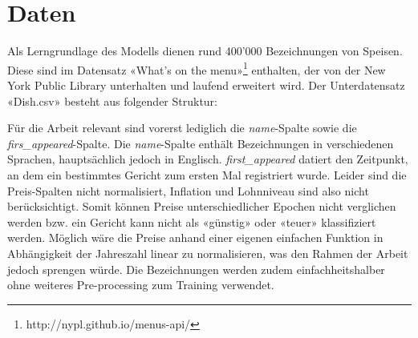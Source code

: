 \section{Daten}
\label{sec:model-data-training}

Als Lerngrundlage des Modells dienen rund 400'000 Bezeichnungen von Speisen.
Diese sind im Datensatz «What's on the menu»\footnote{http://nypl.github.io/menus-api/} enthalten, der von der New York Public Library unterhalten und laufend erweitert wird.
Der Unterdatensatz «Dish.csv» besteht aus folgender Struktur:

\begin{center}
\end{center}

Für die Arbeit relevant sind vorerst lediglich die \textit{name}-Spalte sowie die \textit*{firs\_appeared}-Spalte.
Die \textit{name}-Spalte enthält Bezeichnungen in verschiedenen Sprachen, hauptsächlich jedoch in Englisch.
\textit{first\_appeared} datiert den Zeitpunkt, an dem ein bestimmtes Gericht zum ersten Mal registriert wurde.
Leider sind die Preis-Spalten nicht normalisiert, Inflation und Lohnniveau sind also nicht berücksichtigt.
Somit können Preise unterschiedlicher Epochen nicht verglichen werden bzw. ein Gericht kann nicht als «günstig» oder «teuer» klassifiziert werden.
Möglich wäre die Preise anhand einer eigenen einfachen Funktion in Abhängigkeit der Jahreszahl linear zu normalisieren, was den Rahmen der Arbeit jedoch sprengen würde.
Die Bezeichnungen werden zudem einfachheitshalber ohne weiteres \gls{Pre-processing} zum Training verwendet.